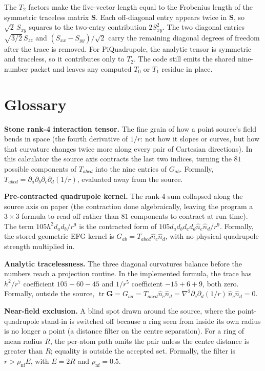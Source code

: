 \documentclass[11pt]{article}
\begin{document}
The \(T_2\) factors make the five-vector length equal to the Frobenius length
of the symmetric traceless matrix \(\bm S\). Each off-diagonal entry appears
twice in \(\bm S\), so \(\sqrt2\,S_{xy}\) squares to the two-entry
contribution \(2S_{xy}^2\). The two diagonal entries
\(\sqrt{3/2}\,S_{zz}\) and \((S_{xx}-S_{yy})/\sqrt2\) carry the remaining
diagonal degrees of freedom after the trace is removed. For PiQuadrupole, the
analytic tensor is symmetric and traceless, so it contributes only to
\(T_2\). The code still emits the shared nine-number packet and leaves any
computed \(T_0\) or \(T_1\) residue in place.

\section{Glossary}

\textbf{Stone rank-4 interaction tensor.} The fine grain of how a point
source's field bends in space (the fourth derivative of \(1/r\): not how it
slopes or curves, but how that curvature changes twice more along every pair of
Cartesian directions). In this calculator the source axis contracts the last
two indices, turning the \(81\) possible components of \(T_{abcd}\) into the
nine entries of \(G_{ab}\). Formally,
\(T_{abcd}=\partial_a\partial_b\partial_c\partial_d(1/r)\), evaluated away
from the source.

\textbf{Pre-contracted quadrupole kernel.} The rank-4 sum collapsed along the
source axis on paper (the contraction done algebraically, leaving the program a
\(3\times3\) formula to read off rather than \(81\) components to contract at
run time). The term
\(105h^2d_ad_b/r^9\) is the contracted form of
\(105d_ad_bd_cd_d\hat n_c\hat n_d/r^9\). Formally, the stored geometric EFG
kernel is \(G_{ab}=T_{abcd}\hat n_c\hat n_d\), with no physical quadrupole
strength multiplied in.

\textbf{Analytic tracelessness.} The three diagonal curvatures balance before
the numbers reach a projection routine. In the implemented formula, the trace
has \(h^2/r^7\) coefficient \(105-60-45\) and \(1/r^5\) coefficient
\(-15+6+9\), both zero. Formally, outside the source,
\(\operatorname{tr}\bm G=G_{aa}=T_{aacd}\hat n_c\hat n_d
=\nabla^2\partial_c\partial_d(1/r)\,\hat n_c\hat n_d=0\).

\textbf{Near-field exclusion.} A blind spot drawn around the source, where the
point-quadrupole stand-in is switched off because a ring seen from inside its
own radius is no longer a point (a distance filter on the centre separation).
For a ring of mean radius \(R\), the per-atom path omits the pair unless the
centre distance is greater than \(R\); equality is outside the accepted set.
Formally, the filter is \(r>\rho_{\mathrm{nf}}E\), with
\(E=2R\) and \(\rho_{\mathrm{nf}}=0.5\).
\end{document}
